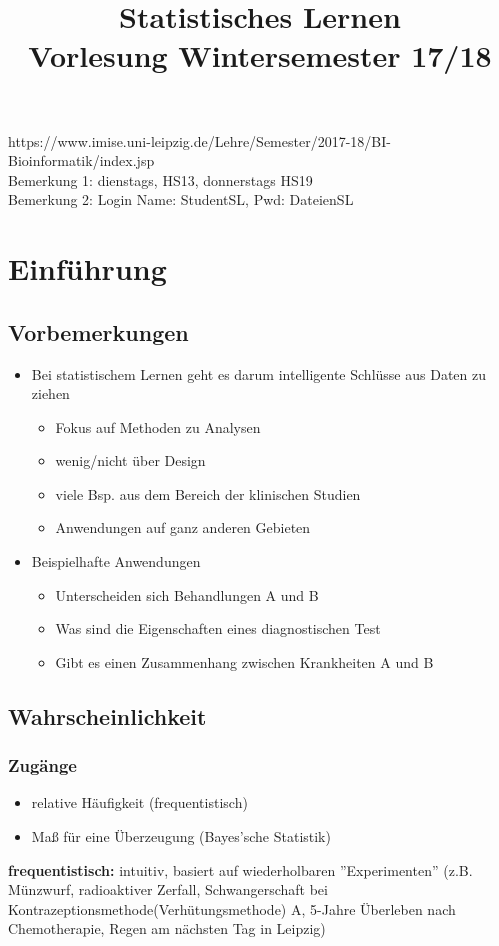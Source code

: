 \documentclass[10pt,a4paper]{article}
\title{Statistisches Lernen\\ \large{Vorlesung Wintersemester 17/18}\\
}
\date{}
\theoremstyle{definition}
\begin{document}
	\maketitle
	
	\begin{center}
		https://www.imise.uni-leipzig.de/Lehre/Semester/2017-18/BI-Bioinformatik/index.jsp\\
		Bemerkung 1: dienstags, HS13, donnerstags HS19\\
		Bemerkung 2: Login Name: StudentSL, Pwd: DateienSL
	\end{center}

	\section{Einführung}
	\subsection{Vorbemerkungen}
	\begin{itemize}
		\item Bei statistischem Lernen geht es darum intelligente Schlüsse aus Daten zu ziehen
		\begin{itemize}
			\item Fokus auf Methoden zu Analysen
			\item wenig/nicht über Design
			\item viele Bsp. aus dem Bereich der klinischen Studien
			\item Anwendungen auf ganz anderen Gebieten
		\end{itemize}
	\item Beispielhafte Anwendungen
	\begin{itemize}
		\item Unterscheiden sich Behandlungen A und B
		\item Was sind die Eigenschaften eines diagnostischen Test
		\item Gibt es einen Zusammenhang zwischen Krankheiten A und B
	\end{itemize}
	\end{itemize}
\subsection{Wahrscheinlichkeit}
\subsubsection{Zugänge}
\begin{itemize}
	\item relative Häufigkeit (frequentistisch)
	\item Maß für eine Überzeugung (Bayes'sche Statistik)
\end{itemize}
\textbf{frequentistisch:} intuitiv, basiert auf wiederholbaren ''Experimenten'' (z.B. Münzwurf, radioaktiver Zerfall, Schwangerschaft bei Kontrazeptionsmethode(Verhütungsmethode) A, 5-Jahre Überleben nach Chemotherapie, Regen am nächsten Tag in Leipzig)
\end{document}

